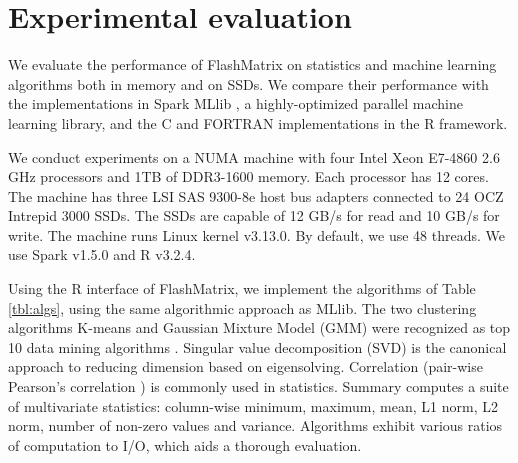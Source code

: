 \vspace{-10pt}
\section{Experimental evaluation}
\vspace{-5pt}
We evaluate the performance of FlashMatrix on statistics and machine learning
algorithms both in memory and on SSDs. We compare their performance with
the implementations in Spark MLlib \cite{mllib}, a highly-optimized parallel
machine learning library, and the C and FORTRAN implementations in the R framework.


We conduct experiments on a NUMA machine with
four Intel Xeon E7-4860 2.6 GHz processors and 1TB of 
DDR3-1600 memory. Each processor has 12 cores. The machine has three LSI SAS 9300-8e
host bus adapters connected to
24 OCZ Intrepid 3000 SSDs. The SSDs are capable of
12 GB/s for read and 10 GB/s for write. The machine runs
Linux kernel v3.13.0. By default, we use 48 threads. 
We use Spark v1.5.0 and R v3.2.4.


Using the R interface of FlashMatrix, we implement the algorithms of 
Table \ref{tbl:algs}, using the same algorithmic approach as MLlib.
The two clustering algorithms 
K-means \cite{kmeans} and Gaussian Mixture Model (GMM) \cite{gmm} 
were recognized as top 10 data mining algorithms \cite{top10}. 
Singular value decomposition (SVD) is the canonical approach to 
reducing dimension based on eigensolving.  Correlation 
(pair-wise Pearson's correlation \cite{cor}) is commonly used in statistics.
Summary computes a suite of multivariate statistics:
column-wise minimum, maximum, mean, L1 norm, L2 norm, number of non-zero values and
		variance.
Algorithms exhibit various ratios of computation to I/O, which aids
a thorough evaluation.



